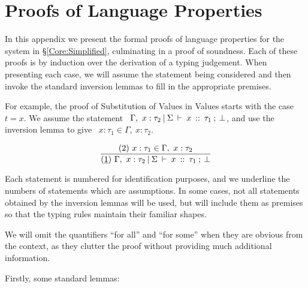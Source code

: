 \appendix

\chapter{Proofs of Language Properties}
\label{proofs}

In this appendix we present the formal proofs of language properties for the system in \S\ref{Core:Simplified}, culminating in a proof of soundness. Each of these proofs is by induction over the derivation of a typing judgement. When presenting each case, we will assume the statement being considered and then invoke the standard inversion lemmas \cite{pierce:tapl} to fill in the appropriate premises.

For example, the proof of Substitution of Values in Values starts with the case $t = x$. We assume the statement 
\ $\Gamma, \ x : \tau_2 \: \arrowvert \: \Sigma \: \vdash \: x \: :: \: \tau_1 \: ; \: \bot$, and use the inversion lemma to give \ 
$x : \tau_1 \in \Gamma, \ x : \tau_2$.

$$
	\frac
	{ (2) \ x : \tau_1 \in \Gamma, \ x : \tau_2 }
	{ (\un{1}) \ 
	  \tyJudge
		{\Gamma, \ x : \tau_2}{\Sigma}
		{x}
		{\tau_1}
		{\bot}
	}
$$	

Each statement is numbered for identification purposes, and we underline the numbers of statements which are assumptions. In some
cases, not all statements obtained by the inversion lemmas will be used, but will include them as premises so that the typing rules maintain their familiar shapes.

We will omit the quantifiers ``for all'' and ``for some'' when they are obvious from the context, as they clutter the proof without providing much additional information.

Firstly, some standard lemmas:







